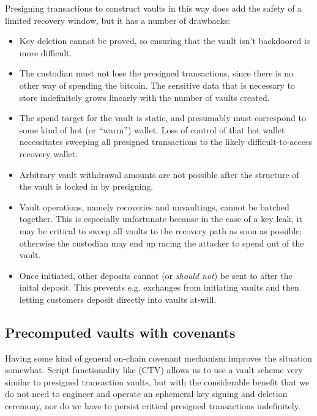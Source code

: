 \documentclass[10pt]{article}
\begin{document}
\pagebreak{}

Presigning transactions to construct vaults in this way does add the safety of a
limited recovery window, but it has a number of drawbacks:

\begin{itemize}

  \item Key deletion cannot be proved, so ensuring that the vault isn't
    backdoored is more difficult.

  \item The custodian must not lose the presigned transactions, since there is no other
    way of spending the bitcoin. The sensitive data that is necessary to store
    indefinitely grows linearly with the number of vaults created.

  \item The spend target for the vault is static, and presumably must correspond to
    some kind of hot (or ``warm'') wallet. Loss of control of that hot wallet
    necessitates sweeping all presigned transactions to the likely difficult-to-access
    recovery wallet.

  \item Arbitrary vault withdrawal amounts are not possible after the structure of the
    vault is locked in by presigning.

  \item Vault operations, namely recoveries and unvaultings, cannot be batched together. This is
    especially unfortunate because in the case of a key leak, it may be
    critical to sweep all vaults to the recovery path as soon as possible; otherwise the
    custodian may end up racing the attacker to spend out of the vault.

  \item Once initiated, other deposits cannot (or \emph{should not}) be sent to after the
    inital deposit. This prevents e.g. exchanges from initiating vaults and then
    letting customers deposit directly into vaults at-will.

\end{itemize}


\subsection*{Precomputed vaults with covenants}

Having some kind of general on-chain covenant mechanism improves the situation
somewhat. Script functionality like \ctv{} (CTV) \cite{CTV} allows us to use a vault
scheme very similar to presigned transaction vaults, but with the considerable benefit
that we do not need to engineer and operate an ephemeral key signing and deletion
ceremony, nor do we have to persist critical presigned transactions indefinitely.
\end{document}
